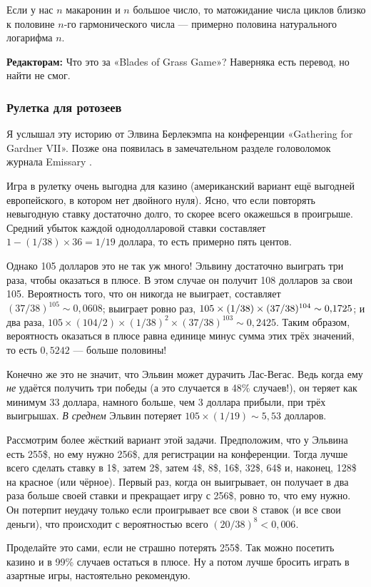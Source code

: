Если у нас $n$ макаронин и $n$ большое число, то матожидание числа циклов близко к половине $n$-го гармонического числа --- примерно половина натурального логарифма $n$.

\begin{addedbytheeditors}
\textbf{Редакторам:} Что это за «Blades of Grass Game»? Наверняка есть перевод, но найти не смог. 
\end{addedbytheeditors}


\subsubsection*{Рулетка для ротозеев}

Я услышал эту историю от Элвина Берлекэмпа на конференции
«Gathering for Gardner VII».
Позже она появилась в замечательном разделе головоломок журнала Emissary \cite[весна/осень 2006 года]{3}.

Игра в рулетку очень выгодна для казино (американский вариант ещё выгодней европейского, в котором нет двойного нуля).
Ясно, что если повторять невыгодную ставку достаточно долго, то скорее всего окажешься в проигрыше.
Средний убыток каждой однодолларовой ставки составляет $1 - (1/38) \times 36 = 1/19$ доллара, то есть примерно пять центов.

Однако 105 долларов это не так уж много!
Эльвину достаточно выиграть три раза, чтобы оказаться в плюсе.
В этом случае он получит 108 долларов за свои 105.
Вероятность того, что он никогда не выиграет, составляет $(37/38)^{105} \sim 0{,}0608$;
выиграет ровно раз, $105 \times (1/38) \times (37/38)^{104} \z\sim 0{,}1725$;
и два раза, $105 \times (104/2) \times (1/38)^2 \times (37/38)^{103} \sim 0{,}2425$.
Таким образом, вероятность оказаться в плюсе равна единице минус сумма этих трёх значений, то есть $0{,}5242$ --- больше половины!

Конечно же это не значит, что Эльвин может дурачить Лас-Вегас.
Ведь когда ему \emph{не} удаётся получить три победы (а это случается в 48\% случаев!), он теряет как минимум 33 доллара, намного больше, чем 3 доллара прибыли, при трёх выигрышах.
\emph{В среднем} Эльвин потеряет $105 \times (1/19) \sim 5{,}53$ долларов.

Рассмотрим более жёсткий вариант этой задачи.
Предположим, что у Эльвина есть 255\$, но ему нужно 256\$, для регистрации на конференции.
Тогда лучше всего сделать ставку в 1\$, затем 2\$, затем 4\$, 8\$, 16\$, 32\$, 64\$ и, наконец, 128\$ на красное (или чёрное).
Первый раз, когда он выигрывает, он получает в два раза больше своей ставки и прекращает игру с 256\$, ровно то, что ему нужно.
Он потерпит неудачу только если проигрывает все свои $8$ ставок (и все свои деньги), что происходит с вероятностью всего $(20/38)^8 < 0{,}006$.

Проделайте это сами, если не страшно потерять 255\$.
Так можно посетить казино и в 99\% случаев остаться в плюсе.
Ну а потом лучше бросить играть в азартные игры, настоятельно рекомендую.
